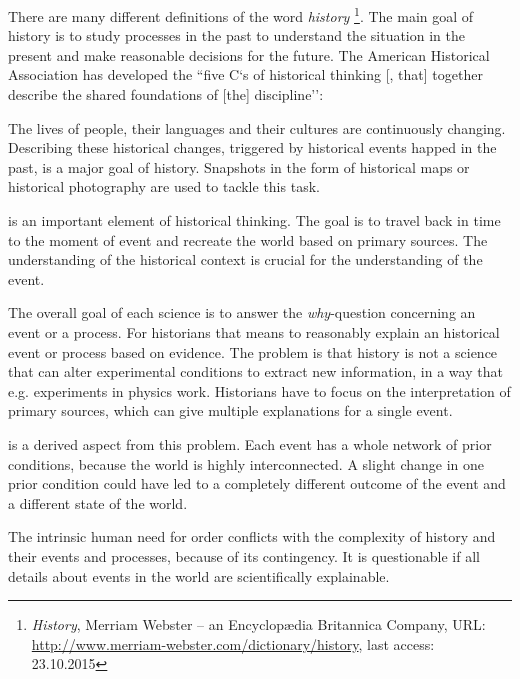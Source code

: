There are many different definitions of the word
\emph{history}
\footnote{
  \textit{History},
  Merriam Webster -- an Encyclopædia Britannica Company,
  URL: \url{http://www.merriam-webster.com/dictionary/history},
  last access: 23.10.2015
}. The main goal of history is to study processes in the past to understand the situation in the present and make reasonable decisions for the future. The American Historical Association has developed the ``five C`s of historical thinking [, that] together describe the shared foundations of [the] discipline''\cite{ahaFiveCs}:
\vspace{-1em}
\begin{description}[labelindent=1.5em] %
    \item[Change over time]
    The lives of people, their languages and their cultures are continuously changing. Describing these historical changes, triggered by historical events happed in the past, is a major goal of history. Snapshots in the form of historical maps or historical photography are used to tackle this task.
    \item[Context]
    is an important element of historical thinking. The goal is to travel back in time to the moment of event and recreate the world based on primary sources. The understanding of the historical context is crucial for the understanding of the event.
    \item[Causality]
    The overall goal of each science is to answer the \emph{why}-question concerning an event or a process. For historians that means to reasonably explain an historical event or process based on evidence. The problem is that history is not a science that can alter experimental conditions to extract new information, in a way that e.g. experiments in physics work. Historians have to focus on the interpretation of primary sources, which can give multiple explanations for a single event.
    \item[Contingency]
    is a derived aspect from this problem. Each event has a whole network of prior conditions, because the world is highly interconnected. A slight change in one prior condition could have led to a completely different outcome of the event and a different state of the world.
    \item[Complexity]
    The intrinsic human need for order conflicts with the complexity of history and their events and processes, because of its contingency. It is questionable if all details about events in the world are scientifically explainable.
\end{description}


